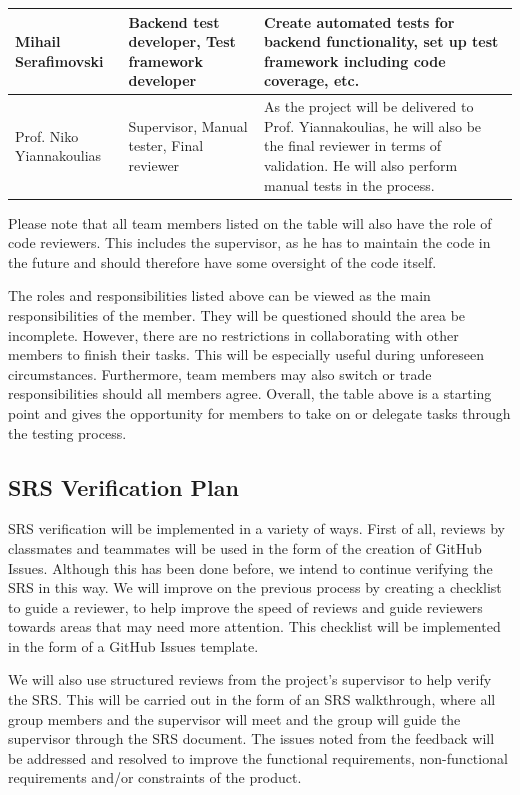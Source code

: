 \documentclass[12pt, titlepage]{article}
\begin{document}
\begin{table}[H]
\begin{adjustwidth}{-2cm}{-2cm}
\begin{tabular}{|l|p{1.8in}|p{2.5in}|}
Mihail Serafimovski      & Backend test developer, Test framework developer      & Create automated tests for backend functionality, set up test framework including code coverage, etc.                                                                \\ \hline
Prof. Niko Yiannakoulias & Supervisor, Manual tester, Final reviewer & As the project will be delivered to Prof. Yiannakoulias, he will also be the final reviewer in terms of validation. He will also perform manual tests in the process. \\ \hline
\end{tabular}
\end{adjustwidth}
\end{table}

 \quad Please note that all team members listed on the table will also have the role of code reviewers. This includes the supervisor, as he has to maintain the code in the future and should therefore have some oversight of the code itself.

The roles and responsibilities listed above can be viewed as the main responsibilities of the member. They will be questioned should the area be incomplete. However, there are no restrictions in collaborating with other members to finish their tasks. This will be especially useful during unforeseen circumstances. Furthermore, team members may also switch or trade responsibilities should all members agree. Overall, the table above is a starting point and gives the opportunity for members to take on or delegate tasks through the testing process.

\subsection{SRS Verification Plan}

SRS verification will be implemented in a variety of ways. First of all, reviews by classmates and teammates will be used in the form of the creation of GitHub Issues. Although this has been done before, we intend to continue verifying the SRS in this way. We will improve on the previous process by creating a checklist to guide a reviewer, to help improve the speed of reviews and guide reviewers towards areas that may need more attention. This checklist will be implemented in the form of a GitHub Issues template.

We will also use structured reviews from the project's supervisor to help verify the SRS. This will be carried out in the form of an SRS walkthrough, where all group members and the supervisor will meet and the group will guide the supervisor through the SRS document. The issues noted from the feedback will be addressed and resolved to improve the functional requirements, non-functional requirements and/or constraints of the product.
\end{document}
